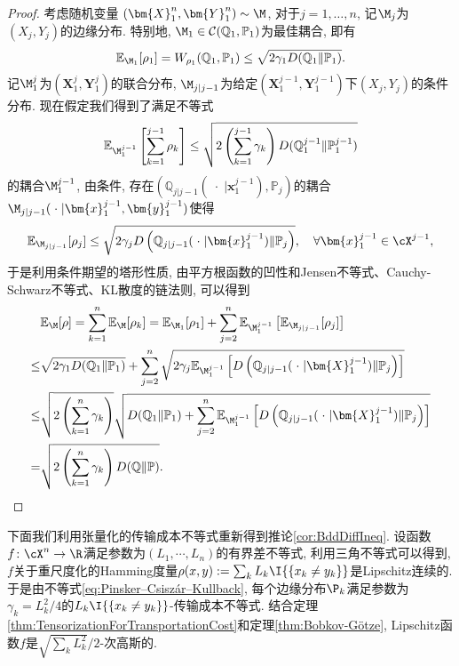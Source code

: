 \begin{proof}
	考虑随机变量 $(\bm{X}_1^n, \bm{Y}_1^n) \sim \M$, 对于$j = 1, \dots, n$, 记$\M_j$为$(X_j, Y_j)$的边缘分布. 
	特别地, $\M_1 \in \mathcal{C}(\mathbb{Q}_1, \mathbb{P}_1)$为最佳耦合, 即有
	\begin{equation*}
		\mathbb{E}_{\M_1} [\rho_1] = W_{\rho_1} (\mathbb{Q}_1, \mathbb{P}_1) \leq \sqrt{2 \gamma_1 D(\mathbb{Q}_1 \| \mathbb{P}_1)}. 
	\end{equation*}
	记$\M_1^j$为$(\bm{X}_1^j, \bm{Y}_1^j)$的联合分布, $\M_{j | j-1}$为给定$(\bm{X}_1^{j-1}, \bm{Y}_1^{j-1})$下$(X_j, Y_j)$的条件分布. 
	现在假定我们得到了满足不等式
	\begin{equation*}
		\mathbb{E}_{\M_1^{j-1}} \left[\sum_{k=1}^{j-1} \rho_k \right]
		\leq \sqrt{2 \left(\sum_{k=1}^{j-1} \gamma_k \right) D(\mathbb{Q}_1^{j-1} \| \mathbb{P}_1^{j-1})}
	\end{equation*}
	的耦合$\M_1^{j-1}$, 由条件, 存在$\left(\mathbb{Q}_{j | j-1}(\;\cdot\; | \bm{x}_1^{j-1}), \mathbb{P}_j\right)$的耦合$\M_{j | j-1}(\;\cdot\; | \bm{x}_1^{j-1}, \bm{y}_1^{j-1})$使得
	\begin{equation*}
		\mathbb{E}_{\M_{j | j-1}}[ \rho_j] 
		\leq \sqrt{2 \gamma_j D\left(\mathbb{Q}_{j | j-1}(\;\cdot\; | \bm{x}_1^{j-1}) \| \mathbb{P}_j\right)}, 
		\quad \forall \bm{x}_1^{j-1} \in \cX^{j-1}, 
	\end{equation*}
	于是利用条件期望的塔形性质, 由平方根函数的凹性和Jensen不等式、Cauchy-Schwarz不等式、KL散度的链法则, 可以得到
	\begin{align*}
		& \mathbb{E}_{\M}[\rho]
		= \sum_{k=1}^n \mathbb{E}_{\M}[ \rho_k]
		= \mathbb{E}_{\M_1}[\rho_1] + \sum_{j=2}^n \mathbb{E}_{\M_1^{j-1}} \left[ \mathbb{E}_{\M_{j | j-1}} [\rho_j] \right] \\
		\leq & \sqrt{2 \gamma_1 D(\mathbb{Q}_1 \| \mathbb{P}_1)} + \sum_{j=2}^n \sqrt{2 \gamma_j \mathbb{E}_{\M_1^{j-1}} \left[ D\left(\mathbb{Q}_{j | j-1}(\;\cdot\; | \bm{X}_1^{j-1}) \| \mathbb{P}_j\right) \right]} \\
		\leq & \sqrt{2 \left(\sum_{k=1}^n \gamma_k \right)} \sqrt{D(\mathbb{Q}_1 \| \mathbb{P}_1) + \sum_{j=2}^n \mathbb{E}_{\M_1^{j-1}} \left[ D\left(\mathbb{Q}_{j | j-1}(\;\cdot\; | \bm{X}_1^{j-1}) \| \mathbb{P}_j\right) \right]} \\
		= & \sqrt{2 \left(\sum_{k=1}^n \gamma_k \right) D(\mathbb{Q} \| \mathbb{P})}. 
	\end{align*}
\end{proof}

 
\begin{example}[有界差不等式']
	下面我们利用张量化的传输成本不等式重新得到推论\ref{cor:BddDiffIneq}.
	设函数$f \colon \cX^n \to \R$满足参数为$(L_1, \cdots, L_n)$的有界差不等式, 利用三角不等式可以得到, $f$关于重尺度化的Hamming度量$\rho(x, y) := \sum_k L_k \I{\{x_k \neq y_k\}}$是Lipschitz连续的. 
	于是由不等式\ref{eq:Pinsker–Csiszár–Kullback}, 每个边缘分布$\P_k$满足参数为$\gamma_k = L_k^2 / 4$的$L_k \I{\{x_k \neq y_k\}}$-传输成本不等式. 
	结合定理\ref{thm:TensorizationForTransportationCost}和定理\ref{thm:Bobkov-Götze}, Lipschitz函数$f$是$\sqrt{\sum_k L_k^2} / 2$-次高斯的. 
\end{example}


